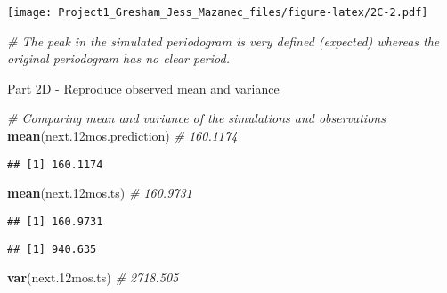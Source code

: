 \documentclass[
]{article}
\newenvironment{Shaded}{\begin{snugshade}}{\end{snugshade}}
\newcommand{\CommentTok}[1]{\textcolor[rgb]{0.56,0.35,0.01}{\textit{#1}}}
\newcommand{\FloatTok}[1]{\textcolor[rgb]{0.00,0.00,0.81}{#1}}
\newcommand{\KeywordTok}[1]{\textcolor[rgb]{0.13,0.29,0.53}{\textbf{#1}}}
\newcommand{\NormalTok}[1]{#1}
\begin{document}
\texttt{[image: Project1\_Gresham\_Jess\_Mazanec\_files/figure-latex/2C-2.pdf]}

\begin{Shaded}
\begin{Highlighting}[]
\CommentTok{# The peak in the simulated periodogram is very defined (expected) whereas the original periodogram has no clear period. }
\end{Highlighting}
\end{Shaded}

Part 2D - Reproduce observed mean and variance

\begin{Shaded}
\begin{Highlighting}[]
\CommentTok{# Comparing mean and variance of the simulations and observations}
\KeywordTok{mean}\NormalTok{(next}\FloatTok{.12}\NormalTok{mos.prediction) }\CommentTok{# 160.1174}
\end{Highlighting}
\end{Shaded}

\begin{verbatim}
## [1] 160.1174
\end{verbatim}

\begin{Shaded}
\begin{Highlighting}[]
\KeywordTok{mean}\NormalTok{(next}\FloatTok{.12}\NormalTok{mos.ts) }\CommentTok{# 160.9731}
\end{Highlighting}
\end{Shaded}

\begin{verbatim}
## [1] 160.9731
\end{verbatim}

\begin{Shaded}
\end{Shaded}

\begin{verbatim}
## [1] 940.635
\end{verbatim}

\begin{Shaded}
\begin{Highlighting}[]
\KeywordTok{var}\NormalTok{(next}\FloatTok{.12}\NormalTok{mos.ts) }\CommentTok{# 2718.505}
\end{Highlighting}
\end{Shaded}
\end{document}
